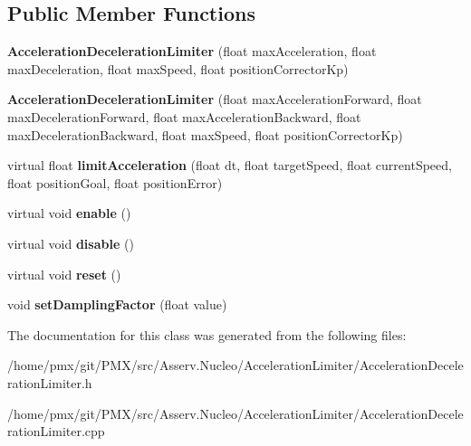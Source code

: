 \subsection*{Public Member Functions}
\begin{DoxyCompactItemize}
\item 
\mbox{\label{classAccelerationDecelerationLimiter_a5a1ba8502999ada787593cff4dd88182}} 
{\bfseries Acceleration\+Deceleration\+Limiter} (float max\+Acceleration, float max\+Deceleration, float max\+Speed, float position\+Corrector\+Kp)
\item 
\mbox{\label{classAccelerationDecelerationLimiter_a0e7ba1a481a4963232ee10fa16053d4f}} 
{\bfseries Acceleration\+Deceleration\+Limiter} (float max\+Acceleration\+Forward, float max\+Deceleration\+Forward, float max\+Acceleration\+Backward, float max\+Deceleration\+Backward, float max\+Speed, float position\+Corrector\+Kp)
\item 
\mbox{\label{classAccelerationDecelerationLimiter_affb4a7fc328b54dbcecd707ba6166ac4}} 
virtual float {\bfseries limit\+Acceleration} (float dt, float target\+Speed, float current\+Speed, float position\+Goal, float position\+Error)
\item 
\mbox{\label{classAccelerationDecelerationLimiter_a7a43a0b14a8914648b40c6e2cc8afbd7}} 
virtual void {\bfseries enable} ()
\item 
\mbox{\label{classAccelerationDecelerationLimiter_ad158f665c287f65daadb170c5ba773e1}} 
virtual void {\bfseries disable} ()
\item 
\mbox{\label{classAccelerationDecelerationLimiter_a40a9b91bbdc780dc5d54ad6490f11bbf}} 
virtual void {\bfseries reset} ()
\item 
\mbox{\label{classAccelerationDecelerationLimiter_a621ad3611b4f20574c42f30d86266915}} 
void {\bfseries set\+Dampling\+Factor} (float value)
\end{DoxyCompactItemize}


The documentation for this class was generated from the following files\+:\begin{DoxyCompactItemize}
\item 
/home/pmx/git/\+P\+M\+X/src/\+Asserv.\+Nucleo/\+Acceleration\+Limiter/Acceleration\+Deceleration\+Limiter.\+h\item 
/home/pmx/git/\+P\+M\+X/src/\+Asserv.\+Nucleo/\+Acceleration\+Limiter/Acceleration\+Deceleration\+Limiter.\+cpp\end{DoxyCompactItemize}
